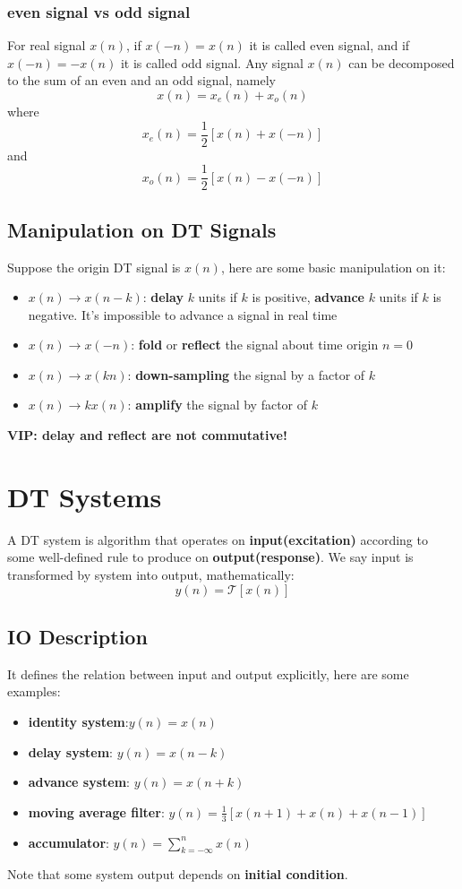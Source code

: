 \documentclass[10pt,a4paper,oneside]{article}
\begin{document}
\subsubsection*{even signal vs odd signal}
For real signal $x(n)$, if $x(-n) = x(n)$ it is called even signal, and if $x(-n) = -x(n)$ it is called odd signal. Any signal $x(n)$ can be decomposed to the sum of an even and an odd signal, namely
\[
x(n) = x_e(n) + x_o(n)
\]
where
\[
x_e(n) = \frac{1}{2} [x(n) + x(-n)]
\]
and
\[
x_o(n) = \frac{1}{2} [x(n) - x(-n)]
\]

\subsection{Manipulation on DT Signals}
Suppose the origin DT signal is $x(n)$, here are some basic manipulation on it:
\begin{itemize}
	\item $x(n) \rightarrow x(n-k)$: \textbf{delay} $k$ units if $k$ is positive, \textbf{advance} $k$ units if $k$ is negative. It's impossible to advance a signal in real time
	\item $x(n) \rightarrow x(-n)$: \textbf{fold} or \textbf{reflect} the signal about time origin $n = 0$
	\item $x(n) \rightarrow x(kn)$: \textbf{down-sampling} the signal by a factor of $k$
	\item $x(n) \rightarrow kx(n)$: \textbf{amplify} the signal by factor of $k$
\end{itemize}
\textbf{VIP: delay and reflect are not commutative!}

\section{DT Systems}
A DT system is algorithm that operates on \textbf{input(excitation)} according to some well-defined rule to produce on \textbf{output(response)}. We say input is transformed by system into output, mathematically:
\[
y(n) = \mathcal{T}[x(n)]
\]

\subsection{IO Description}
It defines the relation between input and output explicitly, here are some examples:
\begin{itemize}
	\item \textbf{identity system}:$y(n) = x(n)$
	\item \textbf{delay system}: $y(n) = x(n-k)$
	\item \textbf{advance system}: $y(n) = x(n+k)$
	\item \textbf{moving average filter}: $y(n) = \frac{1}{3} [x(n+1) + x(n) + x(n-1)]$
	\item \textbf{accumulator}: $y(n) = \sum_{k=-\infty}^{n} x(n)$
\end{itemize}
Note that some system output depends on \textbf{initial condition}.
\end{document}
